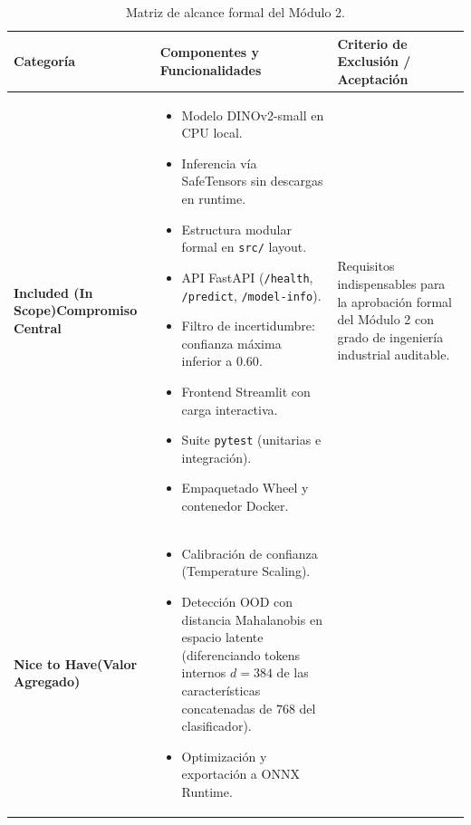 \documentclass[12pt,letterpaper]{article}
\begin{document}
\begin{table}[!htbp]
\centering
\caption{Matriz de alcance formal del Módulo 2.}
\label{tab:alcance}
\footnotesize
\setlength{\tabcolsep}{4.0pt}
\begin{tabularx}{\textwidth}{>{\raggedright\arraybackslash}p{2.25cm} >{\raggedright\arraybackslash}X >{\raggedright\arraybackslash}p{4.25cm}}
\toprule
\textbf{Categoría} & \textbf{Componentes y Funcionalidades} & \textbf{Criterio de Exclusión / Aceptación} \\
\midrule
\textbf{Included (In Scope)\newline Compromiso Central} & 
\begin{itemize}[leftmargin=*,noitemsep,topsep=0pt,before=\vspace{-0.6\baselineskip},after=\vspace{-0.8\baselineskip}]
    \item Modelo DINOv2-small en CPU local.
    \item Inferencia vía SafeTensors sin descargas en runtime.
    \item Estructura modular formal en \texttt{src/} layout.
    \item API FastAPI (\texttt{/health}, \texttt{/predict}, \texttt{/model-info}).
    \item Filtro de incertidumbre: confianza máxima inferior a $0.60$.
    \item Frontend Streamlit con carga interactiva.
    \item Suite \texttt{pytest} (unitarias e integración).
    \item Empaquetado Wheel y contenedor Docker.
\end{itemize} & 
Requisitos indispensables para la aprobación formal del Módulo 2 con grado de ingeniería industrial auditable. \\
\midrule
\textbf{Nice to Have\newline (Valor Agregado)} & 
\begin{itemize}[leftmargin=*,noitemsep,topsep=0pt,before=\vspace{-0.6\baselineskip},after=\vspace{-0.8\baselineskip}]
    \item Calibración de confianza (Temperature Scaling).
    \item Detección OOD con distancia Mahalanobis en espacio latente (diferenciando tokens internos $d=384$ de las características concatenadas de $768$ del clasificador).
    \item Optimización y exportación a ONNX Runtime.

\end{itemize}
\end{tabularx}
\end{table}
\end{document}
